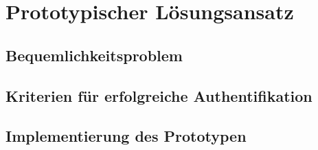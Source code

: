 \chapter{Prototypischer Lösungsansatz}

\section{Bequemlichkeitsproblem}
\section{Kriterien für erfolgreiche Authentifikation}
\section{Implementierung des Prototypen}



